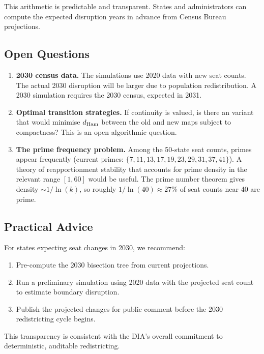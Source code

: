 This arithmetic is predictable and transparent.
States and administrators can compute the expected disruption years in advance
from Census Bureau projections.

\subsection{Open Questions}

\begin{enumerate}
\item \textbf{2030 census data.}
      The simulations use 2020 data with new seat counts.
      The actual 2030 disruption will be larger due to population redistribution.
      A 2030 simulation requires the 2030 census, expected in 2031.

\item \textbf{Optimal transition strategies.}
      If continuity is valued, is there an \ar{} variant that
      would minimise $d_{\rm Ham}$ between the old and new maps
      subject to compactness?
      This is an open algorithmic question.

\item \textbf{The prime frequency problem.}
      Among the 50-state seat counts, primes appear frequently
      (current primes: $\{7, 11, 13, 17, 19, 23, 29, 31, 37, 41\}$).
      A theory of reapportionment stability that accounts for prime
      density in the relevant range $[1, 60]$ would be useful.
      The prime number theorem gives density $\sim 1/\ln(k)$, so
      roughly $1/\ln(40) \approx 27\%$ of seat counts near 40 are prime.
\end{enumerate}

\subsection{Practical Advice}

For states expecting seat changes in 2030, we recommend:
\begin{enumerate}
\item Pre-compute the 2030 bisection tree from current projections.
\item Run a preliminary simulation using 2020 data with the projected
      seat count to estimate boundary disruption.
\item Publish the projected changes for public comment before the 2030
      redistricting cycle begins.
\end{enumerate}

This transparency is consistent with the DIA's overall commitment to
deterministic, auditable redistricting.
